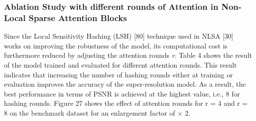 \documentclass{ieeeaccess}
\begin{document}
\subsubsection{Ablation Study with different rounds of Attention in Non-Local Sparse Attention Blocks}
Since the Local Sensitivity Hashing (LSH) [80] technique used in NLSA [30] works on improving the robustness of the model, its computational cost is furthermore reduced by adjusting the attention rounds \textit{r}. Table 4 shows the result of the model trained and evaluated for different attention rounds. This result indicates that increasing the number of hashing rounds either at training or evaluation improves the accuracy of the super-resolution model. As a result, the best performance in terms of PSNR is achieved at the highest value, i.e., 8 for hashing rounds. Figure 27 shows the effect of attention rounds for r = 4 and r = 8 on the benchmark dataset for an enlargement factor of $\times$ 2.
\end{document}
